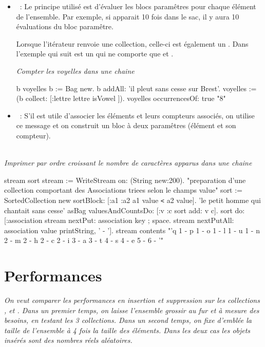 \begin{itemize}

\item {}~:
Le principe utilis\'e est d'\'evaluer les blocs param\^etres pour chaque \'el\'ement
de l'ensemble. Par exemple, si  apparait 10 fois dans le sac, il
y aura 10 \'evaluations du bloc param\^etre.

Lorsque l'it\'erateur renvoie une collection, celle-ci est \'egalement un .
Dans l'exemple qui suit  est un  qui ne comporte que 
 et .

{\em Compter les voyelles dans une chaine}
\begin{scode}
\stBar b voyelles \stBar
    b := Bag new.
    b addAll: 'il pleut sans cesse sur Brest'.
    voyelles := (b collect: [:lettre \stBar lettre isVowel ]).
    voyelles occurrencesOf: true 
    "8"
\end{scode}

\item {}~: S'il est utile d'associer les \'el\'ements
et leurs compteurs associ\'es, on utilise ce message et on construit un bloc
\`a deux param\^etres (\'el\'ement et son compteur).


\end{itemize}
~\\{\em Imprimer par ordre croissant le nombre de caract\`eres apparus dans une chaine}
\begin{scode}

\stBar stream sort \stBar
stream := WriteStream on: (String new:200).
"preparation d'une collection comportant des Associations triees selon le champs value"
sort := SortedCollection new sortBlock: [:a1 :a2 \stBar a1 value \texttt{<} a2 value].
'le petit homme qui chantait sans cesse' asBag valuesAndCountsDo: [:v :c \stBar sort add: v\assoc{} c].
sort do: [:association \stBar stream nextPut: association key ; space.
     stream nextPutAll: association value printString, ' - '].
     stream contents 
"'q 1 - p 1 - o 1 - l 1 - u 1 - n 2 - m 2 - h 2 - c 2 - 
  i 3 - a 3 - t 4 - s 4 - e 5 -   6 - '"
\end{scode}




\section{Performances}
 \label{sec:perf}
{\em On veut comparer les performances en insertion et suppression sur les collections
,  et . Dans un premier temps, on laisse l'ensemble grossir au fur et \`a mesure des besoins, en testant les 3 collections.
Dans un second temps,  on fixe d'embl\'ee la taille de l'ensemble \`a 4 fois
la taille des \'el\'ements. Dans les deux cas les objets ins\'er\'es sont des nombres r\'eels al\'eatoires. }

